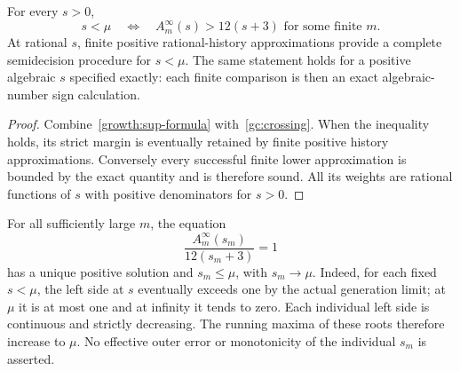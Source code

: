\begin{corollary}
\label{gc:scalar-certificates}
For every $s>0$,
\begin{equation}\label{gc:certificate-equivalence}
 \boxed{s<\mu\quad\Longleftrightarrow\quad
 A_m^\infty(s)>12(s+3)\text{ for some finite }m.}
\end{equation}
At rational $s$, finite positive rational-history approximations provide
a complete semidecision procedure for $s<\mu$. The same statement
holds for a positive algebraic $s$ specified exactly: each finite
comparison is then an exact algebraic-number sign calculation.
\end{corollary}
\begin{proof}
Combine~\eqref{growth:sup-formula} with~\eqref{gc:crossing}.
When the inequality holds, its strict margin is eventually retained
by finite positive history approximations. Conversely every successful
finite lower approximation is bounded by the exact quantity and is
therefore sound. All its weights are rational functions of $s$ with
positive denominators for $s>0$.
\end{proof}

For all sufficiently large $m$, the equation
\[
 \frac{A_m^\infty(s_m)}{12(s_m+3)}=1
\]
has a unique positive solution and $s_m\le\mu$, with $s_m\to\mu$.
Indeed, for each fixed $s<\mu$, the left side at $s$ eventually exceeds
one by the actual generation limit; at $\mu$ it is at most one and at
infinity it tends to zero. Each individual left side is continuous and
strictly decreasing. The running maxima of these roots therefore
increase to $\mu$. No effective outer error or monotonicity of the
individual $s_m$ is asserted.

